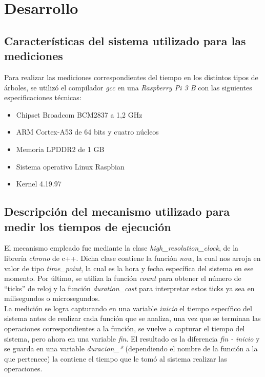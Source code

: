 \documentclass[acmsmall]{acmart}
\begin{document}
\section{Desarrollo}

\subsection{Características del sistema utilizado para las mediciones}

Para realizar las mediciones correspondientes del tiempo en los distintos tipos de árboles, se utilizó el compilador \textit{gcc} en una  \textit{Raspberry Pi 3 B} con las siguientes especificaciones técnicas:
\begin{itemize}
    \item Chipset Broadcom BCM2837 a 1,2 GHz
    \item ARM Cortex-A53 de 64 bits y cuatro núcleos
    \item Memoria LPDDR2 de 1 GB
    \item Sistema operativo Linux Raspbian
    \item Kernel 4.19.97
\end{itemize}


\subsection{Descripción del mecanismo utilizado para medir los tiempos de ejecución}

El mecanismo empleado fue mediante la clase \textit{high\_resolution\_clock}, de la librería \textit{chrono} de c++. Dicha clase contiene la función \textit{now}, la cual nos arroja en valor de tipo \textit{time\_point}, la cual es la hora y fecha específica del sistema en ese momento. Por último, se utiliza la función \textit{count} para obtener el número de “ticks” de reloj y la función \textit{duration\_cast} para interpretar estos ticks ya sea en milisegundos o microsegundos.\\
La medición se logra capturando en una variable \textit{inicio} el tiempo específico del sistema antes de realizar cada función que se analiza, una vez que se terminan las operaciones correspondientes a la función, se vuelve a capturar el tiempo del sistema, pero ahora en una variable \textit{fin}. El resultado es la diferencia \textit{fin - inicio} y se guarda en una variable \textit{duracion\_*} (dependiendo el nombre de la función a la que pertenece) la contiene el tiempo que le tomó al sistema realizar las operaciones.
\end{document}

